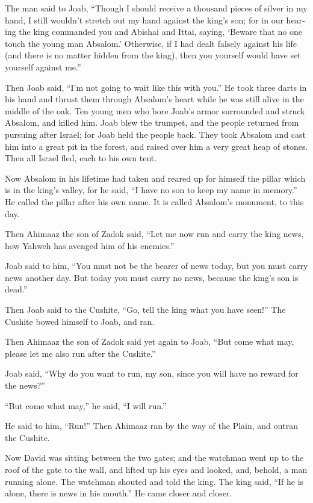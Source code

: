 \begin{paracol}{2}
\begin{otherlanguage}{english}
 The man said to Joab, ``Though I should receive a
thousand pieces of silver in my hand, I still wouldn't stretch out my
hand against the king's son; for in our hearing the king commanded you
and Abishai and Ittai, saying, `Beware that no one touch the young man
Absalom.'  Otherwise, if I had dealt falsely against his
life (and there is no matter hidden from the king), then you yourself
would have set yourself against me.''

 Then Joab said, ``I'm not going to wait like this with
you.'' He took three darts in his hand and thrust them through Absalom's
heart while he was still alive in the middle of the oak. 
Ten young men who bore Joab's armor surrounded and struck Absalom, and
killed him.  Joab blew the trumpet, and the people
returned from pursuing after Israel; for Joab held the people back.
 They took Absalom and cast him into a great pit in the
forest, and raised over him a very great heap of stones. Then all Israel
fled, each to his own tent.

 Now Absalom in his lifetime had taken and reared up for
himself the pillar which is in the king's valley, for he said, ``I have
no son to keep my name in memory.'' He called the pillar after his own
name. It is called Absalom's monument, to this day.

 Then Ahimaaz the son of Zadok said, ``Let me now run and
carry the king news, how Yahweh has avenged him of his enemies.''

 Joab said to him, ``You must not be the bearer of news
today, but you must carry news another day. But today you must carry no
news, because the king's son is dead.''

 Then Joab said to the Cushite, ``Go, tell the king what
you have seen!'' The Cushite bowed himself to Joab, and ran.

 Then Ahimaaz the son of Zadok said yet again to Joab,
``But come what may, please let me also run after the Cushite.''

Joab said, ``Why do you want to run, my son, since you will have no
reward for the news?''

 ``But come what may,'' he said, ``I will run.''

He said to him, ``Run!'' Then Ahimaaz ran by the way of the Plain, and
outran the Cushite.

 Now David was sitting between the two gates; and the
watchman went up to the roof of the gate to the wall, and lifted up his
eyes and looked, and, behold, a man running alone.  The
watchman shouted and told the king. The king said, ``If he is alone,
there is news in his mouth.'' He came closer and closer.


\end{otherlanguage}
\end{paracol}
